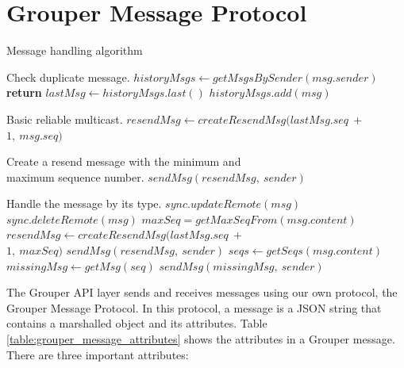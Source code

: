 \documentclass[a4paper,11pt]{report}
\begin{document}
\section{Grouper Message Protocol} \label{section:grouper_message_protocol}

\begin{algorithm}[t]
	\caption{Message handling algorithm}\label{alg:euclid}
	\begin{algorithmic}[1]		
		\LeftComment Check duplicate message.
		\State  $historyMsgs \gets getMsgsBySender(msg.sender)$
		\State \textbf{return}
		\EndIf
		\State $lastMsg \gets historyMsgs.last()$
		\State $historyMsgs.add(msg)$
		
		\LeftComment Basic reliable multicast.
		\State $resendMsg \gets createResendMsg(lastMsg.seq\ +\ $ \\\hspace{2.7cm} $1,\ msg.seq)$
		
		\Comment Create a resend message with the minimum and \\\hspace{1.7cm} maximum sequence number.
		\State $sendMsg(resendMsg,\ sender)$
		\EndIf
		
		\LeftComment Handle the message by its type.
		\State $sync.updateRemote(msg)$
		\State $sync.deleteRemote(msg)$
		\State $maxSeq = getMaxSeqFrom(msg.content)$
		\State $resendMsg \gets createResendMsg(lastMsg.seq\ +\ $ \\\hspace{2.7cm}  $1,\ maxSeq)$
		\State $sendMsg(resendMsg,\ sender)$
		\EndIf
		\State $seqs \gets getSeqs(msg.content)$
		\State $missingMsg \gets getMsg(seq)$
		\State $sendMsg(missingMsg,\ sender)$
		\EndFor
		\EndIf
		\EndProcedure
	\end{algorithmic}
	\label{algorithm:receive_message}
\end{algorithm}

The Grouper API layer sends and receives messages using our own protocol, the Grouper Message Protocol.
In this protocol, a message is a JSON string that contains a marshalled object and its attributes.
Table \ref{table:grouper_message_attributes} shows the attributes in a Grouper message.
There are three important attributes:
\end{document}
